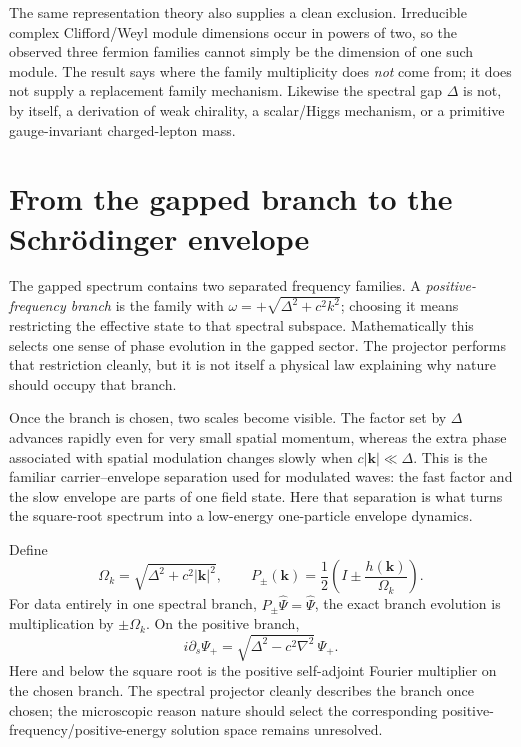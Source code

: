 \documentclass[11pt]{article}
\theoremstyle{definition}
\begin{document}
The same representation theory also supplies a clean exclusion.  Irreducible complex
Clifford/Weyl module dimensions occur in powers of two, so the observed three fermion families
cannot simply be the dimension of one such module.  The result says where the family
multiplicity does \emph{not} come from; it does not supply a replacement family mechanism.
Likewise the spectral gap $\Delta$ is not, by itself, a derivation of weak chirality, a
scalar/Higgs mechanism, or a primitive gauge-invariant charged-lepton mass.

\section{From the gapped branch to the Schrödinger envelope}
\label{sec:schbridge}

The gapped spectrum contains two separated frequency families.  A \emph{positive-frequency
branch} is the family with $\omega=+\sqrt{\Delta^2+c^2k^2}$; choosing it means restricting the
effective state to that spectral subspace.  Mathematically this selects one sense of phase
evolution in the gapped sector.  The projector performs that restriction cleanly, but it is not
itself a physical law explaining why nature should occupy that branch.

Once the branch is chosen, two scales become visible.  The factor set by $\Delta$ advances
rapidly even for very small spatial momentum, whereas the extra phase associated with spatial
modulation changes slowly when $c|\mathbf k|\ll\Delta$.  This is the familiar
carrier--envelope separation used for modulated waves: the fast factor and the slow envelope
are parts of one field state.  Here that separation is what turns the square-root spectrum into
a low-energy one-particle envelope dynamics.

Define
\begin{equation}
 \Omega_k=\sqrt{\Delta^2+c^2|\mathbf k|^2},
 \qquad
 P_\pm(\mathbf k)=\frac12\left(I\pm\frac{h(\mathbf k)}{\Omega_k}\right).
\end{equation}
For data entirely in one spectral branch, $P_\pm\widehat\Psi=\widehat\Psi$, the exact
branch evolution is multiplication by $\pm\Omega_k$.  On the positive branch,
\begin{equation}
 i\partial_s\Psi_+=\sqrt{\Delta^2-c^2\nabla^2}\,\Psi_+.
 \label{eq:sqrtfull}
\end{equation}
Here and below the square root is the positive self-adjoint Fourier multiplier on the chosen
branch.  The spectral projector cleanly describes the branch once chosen; the microscopic
reason nature should select the corresponding positive-frequency/positive-energy solution
space remains unresolved.
\end{document}
